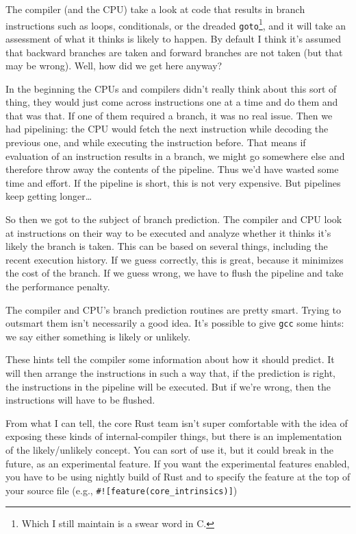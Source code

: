 \documentclass[a4paper]{report}
\begin{document}
The compiler (and the CPU) take a look at code that results in branch instructions  such as loops, conditionals, or the dreaded \texttt{goto}\footnote{Which I still maintain is a swear word in C.}, and it will take an assessment of what it thinks is likely to happen. By default I think it's assumed that backward branches are taken and forward branches are not taken (but that may be wrong).  Well, how did we get here anyway?

In the beginning the CPUs and compilers didn't really think about this sort of thing, they would just come across instructions one at a time and do them and that was that. If one of them required a branch, it was no real issue. Then we had pipelining: the CPU would fetch the next instruction while decoding the previous one, and while executing the instruction before. That means if evaluation of an instruction results in a branch, we might go somewhere else and therefore throw away the contents of the pipeline. Thus we'd have wasted some time and effort. If the pipeline is short, this is not very expensive. But pipelines keep getting longer\ldots

So then we got to the subject of branch prediction. The compiler and CPU look at instructions on their way to be executed and analyze whether it thinks it's likely the branch is taken. This can be based on several things, including the recent execution history. If we guess correctly, this is great, because it minimizes the cost of the branch. If we guess wrong, we have to flush the pipeline and take the performance penalty.

The compiler and CPU's branch prediction routines are pretty smart. Trying to outsmart them isn't necessarily a good idea. It's possible to give \texttt{gcc} some hints: we say either something is likely or unlikely. 

 These hints tell the compiler some information about how it should predict. It will then arrange the instructions in such a way that, if the prediction is right, the instructions in the pipeline will be executed. But if we're wrong, then the instructions will have to be flushed.

From what I can tell, the core Rust team isn't super comfortable with the idea of exposing these kinds of internal-compiler things, but there is an implementation of the likely/unlikely concept. You can sort of use it, but it could break in the future, as an experimental feature. If you want the experimental features enabled, you have to be using nightly build of Rust and to specify the feature at the top of your source file (e.g., \texttt{\#![feature(core\_intrinsics)]})
\end{document}
